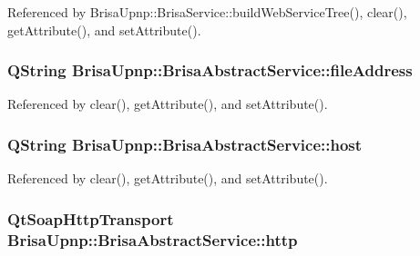 Referenced by BrisaUpnp::BrisaService::buildWebServiceTree(), clear(), getAttribute(), and setAttribute().\hypertarget{classBrisaUpnp_1_1BrisaAbstractService_a43e52fe6edbf817dd1aa7685ce9e8e92}{
\subsubsection[{fileAddress}]{\setlength{\rightskip}{0pt plus 5cm}QString {\bf BrisaUpnp::BrisaAbstractService::fileAddress}}}
\label{classBrisaUpnp_1_1BrisaAbstractService_a43e52fe6edbf817dd1aa7685ce9e8e92}


Referenced by clear(), getAttribute(), and setAttribute().\hypertarget{classBrisaUpnp_1_1BrisaAbstractService_a9033d7f9255f3a1b6d3540258bf2ade1}{
\subsubsection[{host}]{\setlength{\rightskip}{0pt plus 5cm}QString {\bf BrisaUpnp::BrisaAbstractService::host}}}
\label{classBrisaUpnp_1_1BrisaAbstractService_a9033d7f9255f3a1b6d3540258bf2ade1}


Referenced by clear(), getAttribute(), and setAttribute().\hypertarget{classBrisaUpnp_1_1BrisaAbstractService_a416381a60d5ea6dc4ee694272f91aebc}{
\subsubsection[{http}]{\setlength{\rightskip}{0pt plus 5cm}QtSoapHttpTransport {\bf BrisaUpnp::BrisaAbstractService::http}}}
\label{classBrisaUpnp_1_1BrisaAbstractService_a416381a60d5ea6dc4ee694272f91aebc}


